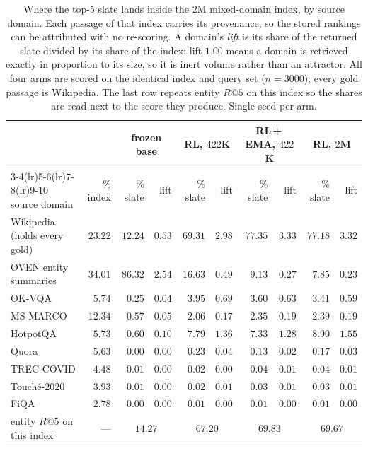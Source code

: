 \begin{table}[H]
\centering\small
\caption{Where the top-$5$ slate lands inside the $2$M mixed-domain index, by source domain.
Each passage of that index carries its provenance, so the stored rankings can be attributed with no
re-scoring. A domain's \emph{lift} is its share of the returned slate divided by its share of the
index: lift $1.00$ means a domain is retrieved exactly in proportion to its size, so it is inert
volume rather than an attractor. All four arms are scored on the identical index and query set
($n=3000$); every gold passage is Wikipedia. The last row repeats entity $R@5$ on this index so the
shares are read next to the score they produce. Single seed per arm.}
\label{tab:mm_haystack_domains}
\begin{tabular}{l r rr rr rr rr}
\toprule
 & & \multicolumn{2}{c}{frozen base} & \multicolumn{2}{c}{RL, $422$K} & \multicolumn{2}{c}{RL\,+\,EMA, $422$K} & \multicolumn{2}{c}{RL, $2$M} \\
\cmidrule(lr){3-4}\cmidrule(lr){5-6}\cmidrule(lr){7-8}\cmidrule(lr){9-10}
source domain & \% index & \% slate & lift & \% slate & lift & \% slate & lift & \% slate & lift \\
\midrule
Wikipedia (holds every gold) & $23.22$ & $12.24$ & $0.53$ & $69.31$ & $2.98$ & $77.35$ & $3.33$ & $77.18$ & $3.32$ \\
OVEN entity summaries & $34.01$ & $86.32$ & $2.54$ & $16.63$ & $0.49$ & $9.13$ & $0.27$ & $7.85$ & $0.23$ \\
OK-VQA & $5.74$ & $0.25$ & $0.04$ & $3.95$ & $0.69$ & $3.60$ & $0.63$ & $3.41$ & $0.59$ \\
MS MARCO & $12.34$ & $0.57$ & $0.05$ & $2.06$ & $0.17$ & $2.35$ & $0.19$ & $2.39$ & $0.19$ \\
HotpotQA & $5.73$ & $0.60$ & $0.10$ & $7.79$ & $1.36$ & $7.33$ & $1.28$ & $8.90$ & $1.55$ \\
Quora & $5.63$ & $0.00$ & $0.00$ & $0.23$ & $0.04$ & $0.13$ & $0.02$ & $0.17$ & $0.03$ \\
TREC-COVID & $4.48$ & $0.01$ & $0.00$ & $0.02$ & $0.00$ & $0.04$ & $0.01$ & $0.04$ & $0.01$ \\
Touch\'e-2020 & $3.93$ & $0.01$ & $0.00$ & $0.02$ & $0.01$ & $0.03$ & $0.01$ & $0.03$ & $0.01$ \\
FiQA & $2.78$ & $0.00$ & $0.00$ & $0.01$ & $0.00$ & $0.01$ & $0.00$ & $0.01$ & $0.00$ \\
\midrule
entity $R@5$ on this index & --- & \multicolumn{2}{c}{$14.27$} & \multicolumn{2}{c}{$67.20$} & \multicolumn{2}{c}{$69.83$} & \multicolumn{2}{c}{$69.67$} \\
\bottomrule
\end{tabular}
\end{table}

